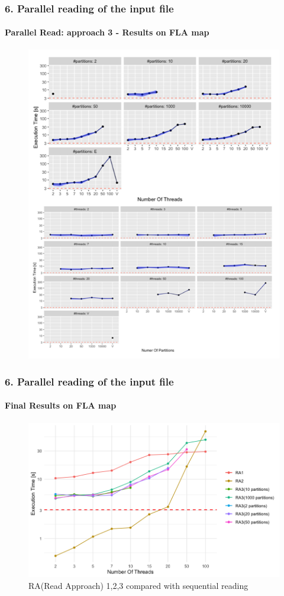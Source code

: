 \documentclass[12pt]{beamer}
\begin{document}
	\begin{frame}
		\frametitle{6. Parallel reading of the input file}
		\framesubtitle{Parallel Read: approach 3 - Results on FLA map}
		\begin{figure}[ht!]
			\centering
			\includegraphics[width=0.5\linewidth]{par_read_3_time.png}
			\label{parread3time}
		\end{figure}
	\end{frame}
	\begin{frame}
		\frametitle{6. Parallel reading of the input file}
		\framesubtitle{Final Results on FLA map}
		\begin{figure}[ht!]
			\centering
			\includegraphics[width=1\linewidth]{par_read_all_time.png}
			\caption{RA(Read Approach) 1,2,3 compared with sequential reading}
			\label{parreadalltime}
		\end{figure}
	\end{frame}
\end{document}
